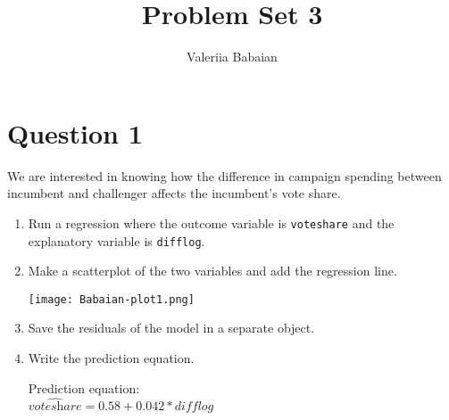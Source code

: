 \documentclass[12pt,letterpaper]{article}
\title{Problem Set 3}
\author{Valeriia Babaian}
\begin{document}
	\maketitle

		\vspace{.25cm}

	\vspace{.5cm}
\section*{Question 1}
\vspace{.25cm}
\noindent We are interested in knowing how the difference in campaign spending between incumbent and challenger affects the incumbent's vote share. 
	\begin{enumerate}
		\item Run a regression where the outcome variable is \texttt{voteshare} and the explanatory variable is \texttt{difflog}.	
		\vspace{.2cm}
		  
		\item Make a scatterplot of the two variables and add the regression line. 			\vspace{.2cm}
		  
 \begin{center}
		\texttt{[image: Babaian-plot1.png]}
	\end{center}
		\item Save the residuals of the model in a separate object.	
			\vspace{.2cm}
		  
		\item Write the prediction equation.\\
			  
		\vspace{.2cm}
	

		Prediction equation: \\
		$\widehat{\textit{voteshare}} = 0.58 + 0.042*\textit{difflog}$
	\end{enumerate}
	
\newpage
\end{document}
